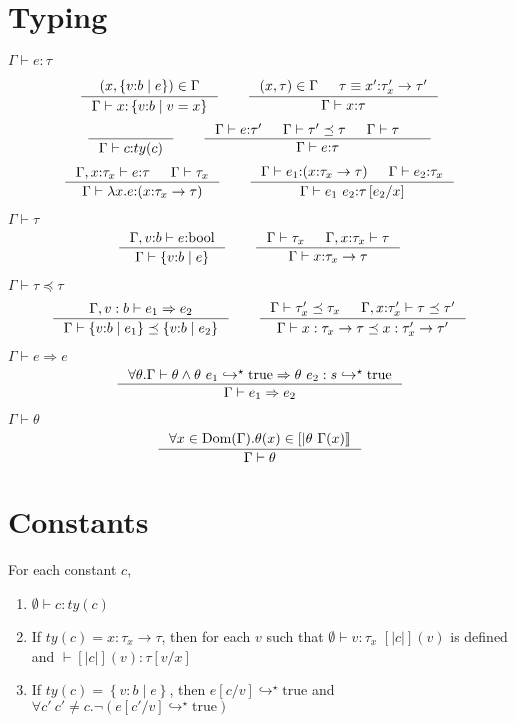 \documentclass[10pt,a4paper]{article}
\newcommand\efun[2]{\ensuremath{\lambda #1 . #2}}
\newcommand\eapp[2]{\ensuremath{#1 \ #2}}
\newcommand\etrue{\ensuremath{\text{true}}}
\newcommand\tbool{\ensuremath{\text{bool}}}
\newcommand\tref[3]{\ensuremath{\left\lbrace #1 \colon #2 \mid #3 \right\rbrace}}
\newcommand\tfun[3]{\ensuremath{#1\colon #2 \rightarrow #3}}
\newcommand\sub[2]{\ensuremath{\left[ #2 / #1 \right]}}
\newcommand\interp[1]{\ensuremath{[|#1|]}}
\newcommand\evals[2]{\ensuremath{#1 \hookrightarrow^\star #2}}
\newcommand\hastype[3]{\ensuremath{#1 \vdash #2 \colon #3}}
\newcommand\iswellformed[2]{\ensuremath{#1 \vdash #2}}
\newcommand\issubtype[3]{\ensuremath{#1 \vdash #2 \preceq #3}}
\newcommand\issubref[3]{\ensuremath{#1 \vdash #2 \Rightarrow #3}}
\begin{document}
\section*{Typing}

\hfill\mbox{\hastype{\Gamma}{e}{\tau}}


$$
\inference{
	(x,\tref{v}{b}{e}) \in \Gamma
}{
	\hastype{\Gamma}{x}{\tref{v}{b}{v=x}}
}
\qquad
\inference{
	(x,\tau) \in \Gamma &&
	\tau \equiv \tfun{x'}{\tau_x'}{\tau'}
}{
	\hastype{\Gamma}{x}{\tau}
}
$$
$$
\inference{
}{
	\hastype{\Gamma}{c}{ty(c)}
}
\qquad
\inference{
	\hastype{\Gamma}{e}{\tau'} &&
	\issubtype{\Gamma}{\tau'}{\tau} &&
	\iswellformed{\Gamma}{\tau} &&
}{
	\hastype{\Gamma}{e}{\tau}
}
$$
$$
\inference{
	\hastype{\Gamma, x\colon\tau_x}{e}{\tau} &&
	\iswellformed{\Gamma}{\tau_x}
}{
	\hastype{\Gamma}{\efun{x}{e}}{(\tfun{x}{\tau_x}{\tau})}
}
\qquad
\inference{
	\hastype{\Gamma}{e_1}{(\tfun{x}{\tau_{x}}{\tau})} &&
	\hastype{\Gamma}{e_2}{\tau_{x}}
}{
	\hastype{\Gamma}{\eapp{e_1}{e_2}}{\tau\sub{x}{e_2}}
}
$$


\hfill\mbox{\iswellformed{\Gamma}{\tau}}
$$
\inference{
	\hastype{\Gamma, v\colon b}{e}{\tbool}
}{
	\iswellformed{\Gamma}{\tref{v}{b}{e}}
}
\qquad
\inference{
	\iswellformed{\Gamma}{\tau_x} &&
	\iswellformed{\Gamma, x \colon \tau_x}{\tau}
}{
	\iswellformed{\Gamma}{\tfun{x}{\tau_x}{\tau}}
}
$$

\hfill\mbox{\issubtype{\Gamma}{\tau}{\tau}}
$$
\inference{
	\issubref{\Gamma, v:b}{e_1}{e_2}
}{
	\issubtype{\Gamma}{\tref{v}{b}{e_1}}{\tref{v}{b}{e_2}}
}
\qquad
\inference{
	\issubtype{\Gamma}{\tau'_x}{\tau_x} &&
	\issubtype{\Gamma, x \colon \tau'_x}{\tau}{\tau'}
}{
	\issubtype{\Gamma}{x:\tau_x \rightarrow \tau}{x:\tau'_x \rightarrow \tau'}
}
$$

\hfill\mbox{\issubref{\Gamma}{e}{e}}
$$
\inference{
	\forall \theta. \iswellformed{\Gamma}{\theta} \land
	\evals{\theta\ e_1}{\etrue} \Rightarrow \evals{\theta\ e_2:s}{\etrue}
}{
	\issubref{\Gamma}{e_1}{e_2}
}
$$



\hfill\mbox{\iswellformed{\Gamma}{\theta}}
$$
\inference{
	\forall x \in \text{Dom}(\Gamma). 
	\theta(x) \in \interp{\theta \ \Gamma(x)}
}{
	\iswellformed{\Gamma}{\theta}
}
$$


\section*{Constants}
For each constant $c$, 
\begin{enumerate}
\item \hastype{\emptyset}{c}{ty(c)}
\item If $ty(c) = \tfun{x}{\tau_x}{\tau}$, then for each $v$ such that
\hastype{\emptyset}{v}{\tau_x} $\interp{c}(v)$ is defined and
\hastype{}{\interp{c}(v)}{\tau\sub{x}{v}}
\item If $ty(c) = \tref{v}{b}{e}$, 
then \evals{e\sub{v}{c}}{\etrue} and $\forall c'\ c' \neq c. \lnot (\evals{e\sub{v}{c'}}{\etrue})$ 
\end{enumerate}
\end{document}
